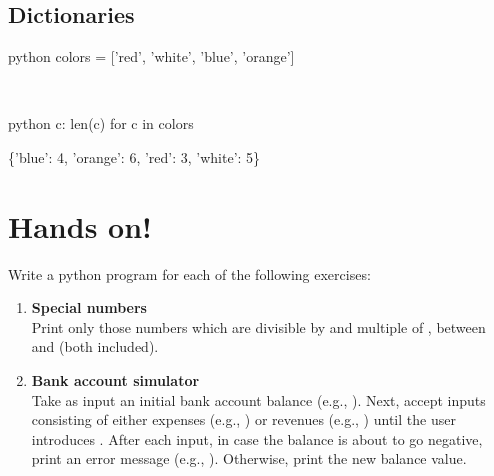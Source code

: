 \documentclass[aspectratio=1610,t]{beamer}
\begin{document}
\subsection{Dictionaries}
\begin{pframe}
 \begin{ipython}
  \begin{pythonin}{python}
colors = ['red', 'white', 'blue', 'orange']
  \end{pythonin}
  \\
  \begin{pythonin}{python}
{c: len(c) for c in colors}
  \end{pythonin}
  \begin{pythonout}
\{'blue': 4, 'orange': 6, 'red': 3, 'white': 5\}
  \end{pythonout}
 \end{ipython}
\end{pframe}


\section{Hands on!}
\begin{pframe}
 \vspace{-0.5cm}
 Write a python program for each of the following exercises:
\begin{enumerate}
  \item \textbf{Special numbers} \\
        Print only those numbers which are divisible by  and multiple of
        , between  and  (both included).
  \item \textbf{Bank account simulator} \\
        Take as input an initial bank account balance (e.g., ). Next,
        accept inputs consisting of either expenses (e.g., ) or
        revenues (e.g., ) until the user introduces .
        After each input, in case the balance is about to go negative, print an
        error message (e.g., ). Otherwise, print the new balance value.
 \end{enumerate}
\end{pframe}
\end{document}
